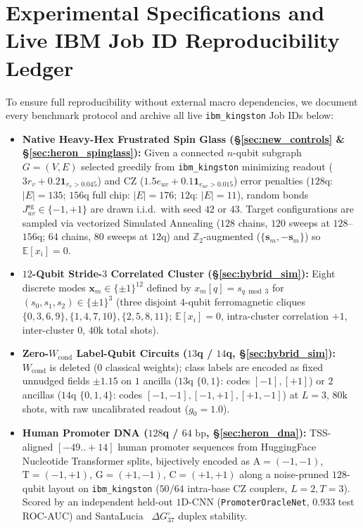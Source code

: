 \documentclass[11pt]{article}
\begin{document}
\section{Experimental Specifications and Live IBM Job ID Reproducibility Ledger}
\label{app:specs}
To ensure full reproducibility without external macro dependencies, we document every benchmark protocol and archive all live \texttt{ibm\_kingston} Job IDs below:
\begin{itemize}[leftmargin=1.4em,itemsep=2pt]
  \item \textbf{Native Heavy-Hex Frustrated Spin Glass (\S\ref{sec:new_controls} \& \S\ref{sec:heron_spinglass}):} Given a connected $n$-qubit subgraph $G=(V,E)$ selected greedily from \texttt{ibm\_kingston} minimizing readout ($3r_v + 0.2\mathbf{1}_{r_v>0.045}$) and CZ ($1.5e_{uv}+0.1\mathbf{1}_{e_{uv}>0.015}$) error penalties ($128$q: $|E|{=}135$; $156$q full chip: $|E|{=}176$; $12$q: $|E|{=}11$), random bonds $J^{\text{sg}}_{uv}\in\{-1,+1\}$ are drawn i.i.d.\ with seed $42$ or $43$. Target configurations are sampled via vectorized Simulated Annealing ($128$ chains, $120$ sweeps at $128$--$156$q; $64$ chains, $80$ sweeps at $12$q) and $\mathbb{Z}_2$-augmented ($\{\mathbf{s}_m,-\mathbf{s}_m\}$) so $\mathbb{E}[x_i]{=}0$.
  \item \textbf{$12$-Qubit Stride-$3$ Correlated Cluster (\S\ref{sec:hybrid_sim}):} Eight discrete modes $\mathbf{x}_m\in\{\pm 1\}^{12}$ defined by $x_m[q] = s_{q\bmod 3}$ for $(s_0,s_1,s_2)\in\{\pm 1\}^3$ (three disjoint $4$-qubit ferromagnetic cliques $\{0,3,6,9\}, \{1,4,7,10\}, \{2,5,8,11\}$; $\mathbb{E}[x_i]{=}0$, intra-cluster correlation $+1$, inter-cluster $0$, $40\text{k}$ total shots).
  \item \textbf{Zero-$W_{\text{cond}}$ Label-Qubit Circuits ($13$q / $14$q, \S\ref{sec:hybrid_sim}):} $W_{\text{cond}}$ is deleted ($0$ classical weights); class labels are encoded as fixed unnudged fields $\pm 1.15$ on $1$ ancilla ($13$q $\{0,1\}$: codes $[-1],[+1]$) or $2$ ancillas ($14$q $\{0,1,4\}$: codes $[-1,-1],[-1,+1],[+1,-1]$) at $L{=}3$, $80\text{k}$ shots, with raw uncalibrated readout ($g_0{=}1.0$).
  \item \textbf{Human Promoter DNA ($128$q / $64\text{ bp}$, \S\ref{sec:heron_dna}):} TSS-aligned $[-49..+14]$ human promoter sequences from HuggingFace Nucleotide Transformer splits, bijectively encoded as $\text{A}{=}(-1,-1)$, $\text{T}{=}(-1,+1)$, $\text{G}{=}(+1,-1)$, $\text{C}{=}(+1,+1)$ along a noise-pruned $128$-qubit layout on \texttt{ibm\_kingston} ($50/64$ intra-base CZ couplers, $L{=}2, T{=}3$). Scored by an independent held-out $1$D-CNN (\texttt{PromoterOracleNet}, $0.933$ test ROC-AUC) and SantaLucia~\cite{santalucia1998dna} $\Delta G^\circ_{37}$ duplex stability.
\end{itemize}
\end{document}
